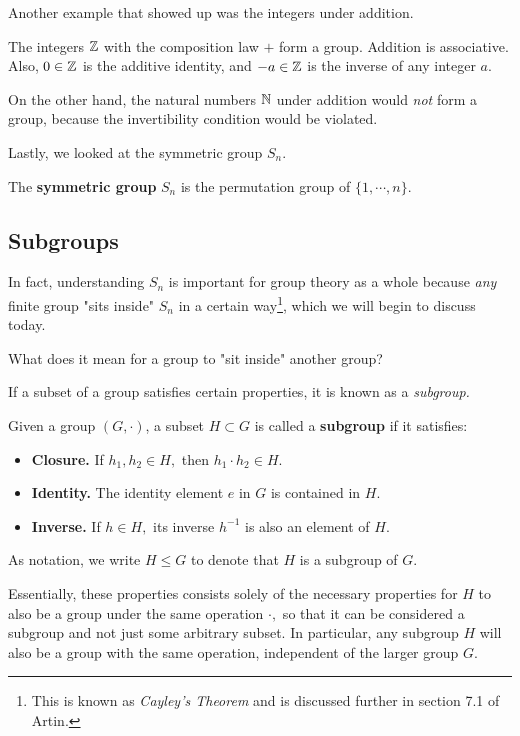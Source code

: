 Another example that showed up was the integers under addition. 

\begin{example}
The integers $\mathbb Z$ with the composition law $+$ form a group. Addition is associative. Also, $0 \in \mathbb Z$ is the additive identity, and $-a \in \mathbb Z$ is the inverse of any integer $a.$
\end{example}
On the other hand, the natural numbers $\mathbb N$ under addition would \emph{not} form a group, because the invertibility condition would be violated.

Lastly, we looked at the symmetric group $S_n.$ 

\begin{example}
The \textbf{symmetric group} $S_n$ is the permutation group of $\{1, \cdots, n\}.$ 
\end{example}

\subsection{Subgroups}
In fact, understanding $S_n$ is important for group theory as a whole because \emph{any} finite group "sits inside" $S_n$ in a certain way\footnote{This is known as \emph{Cayley's Theorem} and is discussed further in section 7.1 of Artin.}, which we will begin to discuss today.
\begin{qq}
What does it mean for a group to "sit inside" another group?
\end{qq}

If a subset of a group satisfies certain properties, it is known as a \emph{subgroup.}
\begin{definition}
Given a group $(G, \cdot)$, a subset $H \subset G$ is called a \textbf{subgroup} if it satisfies:
\begin{itemize}
    \item \textbf{Closure.} If $h_1, h_2 \in H,$ then $h_1 \cdot h_2 \in H.$
    \item \textbf{Identity.} The identity element $e$ in $G$ is contained in $H.$
    \item \textbf{Inverse.} If $h \in H,$ its inverse $h^{-1}$ is also an element of $H.$
\end{itemize}

As notation, we write $H \leq G$ to denote that $H$ is a subgroup of $G.$
\end{definition}

Essentially, these properties consists solely of the necessary properties for $H$ to also be a group under the same operation $\cdot,$ so that it can be considered a subgroup and not just some arbitrary subset. In particular, any subgroup $H$ will also be a group with the same operation, independent of the larger group $G.$

